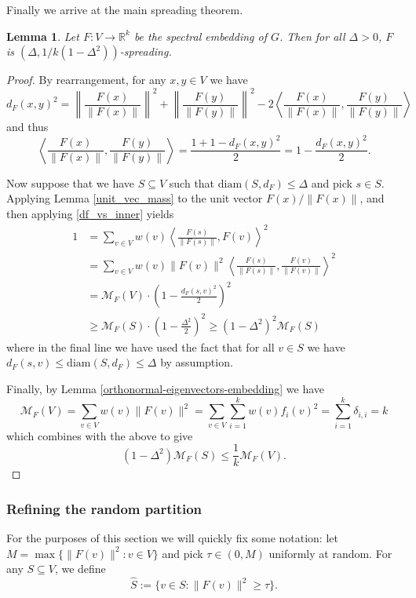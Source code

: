 \documentclass[a4paper,11pt]{article}
\newtheorem{lemma}[theorem]{Lemma}
\theoremstyle{definition}
\newcommand{\R}{\mathbb{R}}
\newcommand{\diam}[1]{\mathrm{diam}\left(#1\right)}
\newcommand{\inner}[2]{\left\langle #1, #2 \right\rangle}
\newcommand{\mass}[1]{\mathcal{M}_F\left(#1\right)}
\begin{document}
Finally we arrive at the main spreading theorem.
\begin{lemma}\label{spreading}
Let $F: V \to \R^k$ be the spectral embedding of $G$. Then for all $\Delta > 0$, $F$ is $\left(\Delta, 1/k(1-\Delta^2)\right)$-spreading.
\end{lemma}
\begin{proof}
By rearrangement, for any $x, y \in V$ we have
\[
    d_F(x, y)^2 = \left\|\frac{F(x)}{\|F(x)\|}\right\|^2 + \left\|\frac{F(y)}{\|F(y)\|}\right\|^2 - 2\inner{\frac{F(x)}{\|F(x)\|}}{\frac{F(y)}{\|F(y)\|}}
\]
and thus
\begin{equation}\label{df_vs_inner}
\inner{\frac{F(x)}{\|F(x)\|}}{\frac{F(y)}{\|F(y)\|}} = \frac{1 + 1 - d_F(x, y)^2}{2} = 1 - \frac{d_F(x, y)^2}{2}.
\end{equation}

Now suppose that we have $S \subseteq V$ such that $\diam{S, d_F} \le \Delta$ and pick $s \in S$. Applying Lemma \ref{unit_vec_mass} to the unit vector $F(x)/\|F(x)\|$, and then applying \eqref{df_vs_inner} yields
\begin{align*}
1 &= \sum_{v \in V}w(v)\inner{\frac{F(s)}{\|F(s)\|}}{F(v)}^2 \\
&= \sum_{v \in V}w(v) \|F(v)\|^2 \inner{\frac{F(s)}{\|F(s)\|}}{\frac{F(v)}{\|F(v)\|}}^2 \\
&= \mass{V} \cdot \left(1 - \frac{d_F(s, v)^2}{2}\right)^2 \\
&\ge \mass{S} \cdot \left(1 - \frac{\Delta^2}{2}\right)^2
\ge (1 - \Delta^2)^2 \mass{S}
\end{align*}
where in the final line we have used the fact that for all $v \in S$ we have $d_F(s, v) \le \diam{S, d_F} \le \Delta$ by assumption.

Finally, by Lemma \ref{orthonormal-eigenvectors-embedding} we have
\[
\mass{V} = \sum_{v \in V} w(v)\|F(v)\|^2 = \sum_{v \in V}\sum_{i=1}^k w(v)f_i(v)^2 = \sum_{i = 1}^k \delta_{i,i} = k
\]
which combines with the above to give
\[
(1 - \Delta^2) \mass{S} \le \frac{1}{k} \mass{V}.
\]
\end{proof}

\subsubsection{Refining the random partition}

For the purposes of this section we will quickly fix some notation: let $M = \max\{\|F(v)\|^2 : v \in V\}$ and pick $\tau \in (0, M)$ uniformly at random. For any $S \subseteq V$, we define
\[
\hat{S} := \{ v \in S : \|F(v)\|^2 \ge \tau \}.
\]
\end{document}

